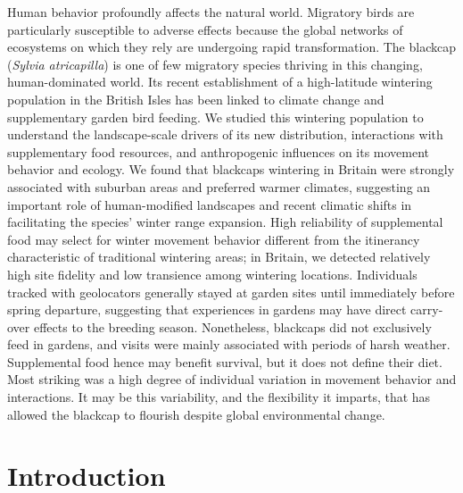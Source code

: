 \documentclass[a4paper, nobind]{templates/ociamthesis}
\begin{document}
Human behavior profoundly affects the natural world. Migratory birds are particularly susceptible to adverse effects because the global networks of ecosystems on which they rely are undergoing rapid transformation. The blackcap (\emph{Sylvia atricapilla}) is one of few migratory species thriving in this changing, human-dominated world. Its recent establishment of a high-latitude wintering population in the British Isles has been linked to climate change and supplementary garden bird feeding. We studied this wintering population to understand the landscape-scale drivers of its new distribution, interactions with supplementary food resources, and anthropogenic influences on its movement behavior and ecology. We found that blackcaps wintering in Britain were strongly associated with suburban areas and preferred warmer climates, suggesting an important role of human-modified landscapes and recent climatic shifts in facilitating the species' winter range expansion. High reliability of supplemental food may select for winter movement behavior different from the itinerancy characteristic of traditional wintering areas; in Britain, we detected relatively high site fidelity and low transience among wintering locations. Individuals tracked with geolocators generally stayed at garden sites until immediately before spring departure, suggesting that experiences in gardens may have direct carry-over effects to the breeding season. Nonetheless, blackcaps did not exclusively feed in gardens, and visits were mainly associated with periods of harsh weather. Supplemental food hence may benefit survival, but it does not define their diet. Most striking was a high degree of individual variation in movement behavior and interactions. It may be this variability, and the flexibility it imparts, that has allowed the blackcap to flourish despite global environmental change.

\hypertarget{introduction}{%
\section{Introduction}\label{introduction}}
\end{document}

